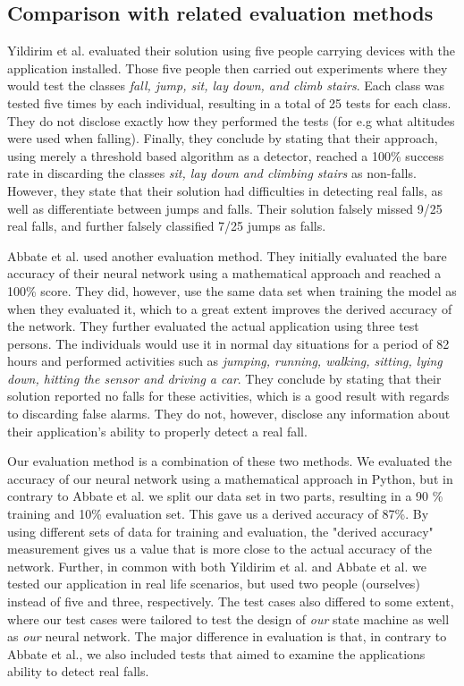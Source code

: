 \documentclass[12pt, a4paper, onecolumn]{article}
\begin{document}
	\subsection{Comparison with related evaluation methods}
	Yildirim et al. evaluated their solution using five people carrying devices with the application installed. Those five people then carried out experiments where they would test the classes \textit{fall, jump, sit, lay down, and climb stairs}. Each class was tested five times by each individual, resulting in a total of 25 tests for each class. They do not disclose exactly how they performed the tests (for e.g what altitudes were used when falling). Finally, they conclude by stating that their approach, using merely a threshold based algorithm as a detector, reached a 100\% success rate in discarding the classes \textit{sit, lay down and climbing stairs} as non-falls. However, they state that their solution had difficulties in detecting real falls, as well as differentiate between jumps and falls. Their solution falsely missed 9/25 real falls, and further falsely classified 7/25 jumps as falls. 
	
	
	Abbate et al. used another evaluation method. They initially evaluated the bare accuracy of their neural network using a mathematical approach and reached a 100\% score. They did, however, use the same data set when training the model as when they evaluated it, which to a great extent improves the derived accuracy of the network. They further evaluated the actual application using three test persons. The individuals would use it in normal day situations for a period of 82 hours and performed activities such as \textit{jumping, running, walking, sitting, lying down, hitting the sensor and driving a car}. They conclude by stating that their solution reported no falls for these activities, which is a good result with regards to discarding false alarms. They do not, however, disclose any information about their application's ability to properly detect a real fall.
	
	
	Our evaluation method is a combination of these two methods. We evaluated the accuracy of our neural network using a mathematical approach in Python, but in contrary to Abbate et al. we split our data set in two parts, resulting in a 90 \% training and 10\%  evaluation set. This gave us a derived accuracy of 87\%. By using different sets of data for training and evaluation, the "derived accuracy" measurement gives us a value that is more close to the actual accuracy of the network. Further, in common with both Yildirim et al. and Abbate et al. we tested our application in real life scenarios, but used two people (ourselves) instead of five and three, respectively. The test cases also differed to some extent, where our test cases were tailored to test the design of \textit{our} state machine as well as \textit{our} neural network. The major difference in evaluation is that, in contrary to Abbate et al., we also included tests that aimed to examine the applications ability to detect real falls. 
\end{document}
